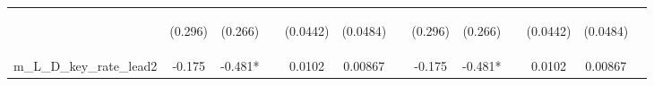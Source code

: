 \documentclass[]{article}
\begin{document}
\begin{center}
\begin{tabular}{lcccccccccccc}
\vspace{4pt} & \begin{footnotesize}(0.296)\end{footnotesize} & \begin{footnotesize}(0.266)\end{footnotesize} & \begin{footnotesize}\end{footnotesize} & \begin{footnotesize}(0.0442)\end{footnotesize} & \begin{footnotesize}(0.0484)\end{footnotesize} & \begin{footnotesize}\end{footnotesize} & \begin{footnotesize}(0.296)\end{footnotesize} & \begin{footnotesize}(0.266)\end{footnotesize} & \begin{footnotesize}\end{footnotesize} & \begin{footnotesize}(0.0442)\end{footnotesize} & \begin{footnotesize}(0.0484)\end{footnotesize} & \begin{footnotesize}\end{footnotesize} \\
m\_L\_D\_key\_rate\_lead2 & -0.175 & -0.481* &  & 0.0102 & 0.00867 &  & -0.175 & -0.481* &  & 0.0102 & 0.00867 &  \\

\end{tabular}
\end{center}
\end{document}
